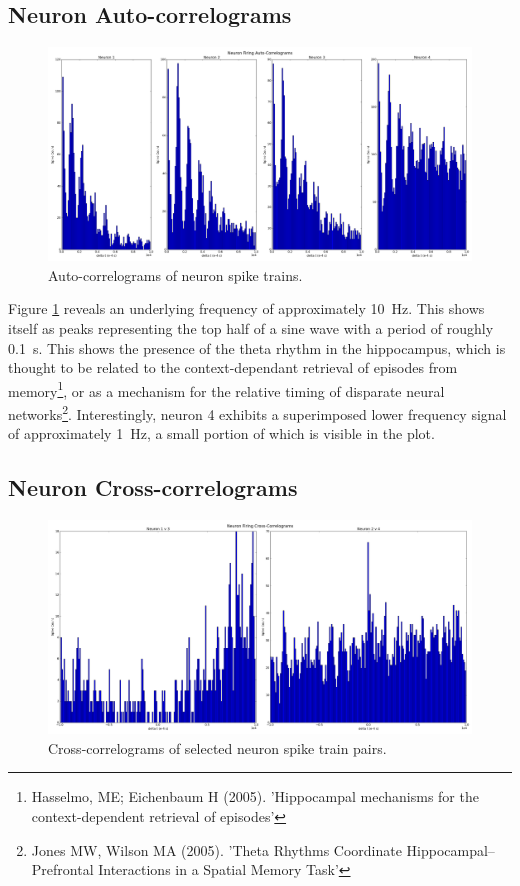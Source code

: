 \documentclass[a4paper, 10pt]{article}
\begin{document}
\subsection*{Neuron Auto-correlograms}
\begin{figure}[H]
  \centering
  \includegraphics[width=1.0\textwidth]{neuron_acorr_plot.png}
  \caption{Auto-correlograms of neuron spike trains.}
  \label{fig:acorr}
\end{figure}

Figure \ref{fig:acorr} reveals an underlying frequency of approximately
\SI{10}{\hertz}. This shows itself as peaks representing the top half of a sine
wave with a period of roughly \SI{0.1}{\second}. This shows the presence of the
theta rhythm in the hippocampus, which is thought to be related to the
context-dependant retrieval of episodes from memory\footnote{Hasselmo, ME;
  Eichenbaum H (2005). 'Hippocampal mechanisms for the context-dependent
  retrieval of episodes'}, or as a mechanism for the relative timing of
disparate neural networks\footnote{Jones MW, Wilson MA (2005). 'Theta Rhythms
  Coordinate Hippocampal–Prefrontal Interactions in a Spatial Memory
  Task'}. Interestingly, neuron 4 exhibits a superimposed lower frequency signal
of approximately \SI{1}{\hertz}, a small portion of which is visible in the
plot.

\subsection*{Neuron Cross-correlograms}
\begin{figure}[H]
  \centering
  \includegraphics[width=1.0\textwidth]{neuron_xcorr_plot.png}
  \caption{Cross-correlograms of selected neuron spike train pairs.}
  \label{fig:xcorr}
\end{figure}
\end{document}
